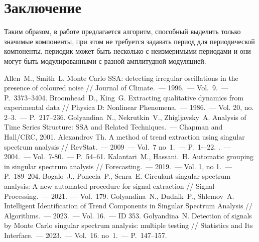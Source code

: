 \documentclass[12pt]{article}
\begin{document}
\section{Заключение}
Таким образом, в работе предлагается алгоритм, способный выделить только значимые компоненты, при этом не требуется задавать период для периодической компоненты, периодик может быть несколько с неизмеримыми периодами и они могут быть модулированными с разной амплитудной модуляцией. 


\begin{thebibliography}{10}

     Allen~M., Smith~L. Monte Carlo SSA: detecting irregular oscillations in the presence of coloured noise // Journal of Climate.~--- 1996.~--- Vol.~9.~--- P.~3373--3404.
     Broomhead~D., King~G. Extracting qualitative dynamics from experimental data // Physica D: Nonlinear Phenomena.~--- 1986.~--- Vol. 20, no. 2–3.~--- P.~217--236.
     Golyandina~N., Nekrutkin~V., Zhigljavsky~A. Analysis of Time Series Structure: SSA and Related Techniques.~--- Chapman and Hall/CRC, 2001.
     Alexandrov Th. A method of trend extraction using singular spectrum analysis // RevStat.~--- 2009~--- Vol.~7 no~1.~--- P.~1-–22.
    .~--- 2004.~--- Vol.~7-80.~--- P.~54--61.
     Kalantari~M., Hassani.~H. Automatic grouping in singular spectrum analysis // Forecasting.~--- 2019.~--- Vol. 1, no 1.~--- P.~189--204.
     Bogalo~J., Poncela~P., Senra~E. Circulant singular spectrum analysis: A new automated procedure for signal extraction // Signal Processing.~--- 2021.~--- Vol.~179.
     Golyandina~N., Dudnik~P., Shlemov~A. Intelligent Identification of Trend Components in Singular Spectrum Analysis // Algorithms.~--- 2023.~--- Vol. 16.~--- ID 353.
     Golyandina~N. Detection of signals by Monte Carlo singular spectrum analysis: multiple testing // Statistics and Its Interface.~--- 2023.~--- Vol.~16. no~1.~--- P.~147--157.

\end{thebibliography}
\end{document}
